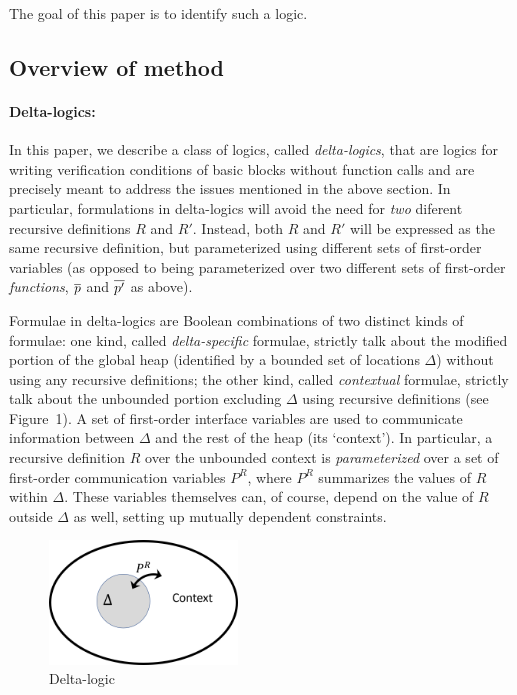 The goal of this paper is to identify such a logic.


\subsection{Overview of method}

\paragraph{Delta-logics:}
In this paper, we describe a class of logics, called \emph{delta-logics}, that are logics for writing verification conditions of basic blocks without function calls and are precisely meant to address the issues mentioned in the above section. In particular, formulations in delta-logics will avoid the need for \emph{two} diferent recursive definitions $R$ and $R'$.
Instead, both $R$ and $R'$ will be expressed as the same recursive definition, but parameterized using different sets of first-order variables
(as opposed to being parameterized over two different sets of first-order \emph{functions}, $\overline{p}$ and $\overline{p'}$ as above).

Formulae in delta-logics are Boolean combinations of two distinct kinds of formulae: one kind, called \emph{delta-specific} formulae, strictly talk about the modified portion of the global heap (identified by a bounded set of locations $\Delta$) without using
any recursive definitions; the other 
kind, called \emph{contextual} formulae, strictly talk about the unbounded portion excluding $\Delta$ using recursive definitions (see Figure~1).
A set of first-order interface variables are used to communicate information between $\Delta$ and the rest of the heap (its `context'). In particular, a recursive definition $R$ over the unbounded context is \emph{parameterized}
over a set of first-order communication variables $P^R$, where $P^R$ summarizes the values of $R$ within $\Delta$. These variables themselves can, of course, depend on the value of $R$ outside $\Delta$ as well, setting up mutually dependent constraints. 

\begin{figure}
  \includegraphics[width= 50mm]{PR.png}
  \caption{Delta-logic}
  \label{pr}
\end{figure}


